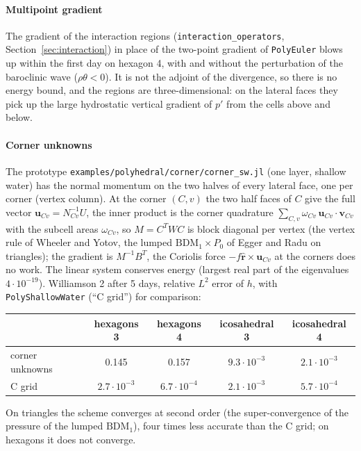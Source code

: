 \documentclass[11pt,a4paper]{article}
\newcommand{\code}[1]{\texttt{#1}}
\newcommand{\bu}{\mathbf{u}}
\newcommand{\bv}{\mathbf{v}}
\newcommand{\rhat}{\hat{\mathbf{r}}}
\begin{document}
\paragraph{Multipoint gradient} The gradient of the interaction regions (\code{interaction\_operators},
Section~\ref{sec:interaction}) in place of the two-point gradient of \code{PolyEuler} blows up within the first
day on hexagon 4, with and without the perturbation of the baroclinic wave ($\rho\theta < 0$). It is not
the adjoint of the divergence, so there is no energy bound, and the regions are three-dimensional: on the
lateral faces they pick up the large hydrostatic vertical gradient of $p'$ from the cells above and below.

\paragraph{Corner unknowns} The prototype \code{examples/polyhedral/corner/corner\_sw.jl} (one layer,
shallow water) has the normal momentum on the two halves of every lateral face, one per corner (vertex
column). At the corner $(C, v)$ the two half faces of $C$ give the full vector $\bu_{Cv} = N_{Cv}^{-1}U$,
the inner product is the corner quadrature $\sum_{C,v}\omega_{Cv}\,\bu_{Cv}\cdot\bv_{Cv}$ with the subcell
areas $\omega_{Cv}$, so $M = C^TWC$ is block diagonal per vertex (the vertex rule of Wheeler and Yotov,
the lumped $\mathrm{BDM}_1\times P_0$ of Egger and Radu on triangles); the gradient is $M^{-1}B^T$, the
Coriolis force $-f\rhat\times\bu_{Cv}$ at the corners does no work. The linear system conserves energy
(largest real part of the eigenvalues $4\cdot10^{-19}$). Williamson 2 after 5 days, relative $L^2$
error of $h$, with \code{PolyShallowWater} (``C grid'') for comparison:
\begin{center}\small
\begin{tabular}{lcccc}
\toprule
& hexagons 3 & hexagons 4 & icosahedral 3 & icosahedral 4 \\
\midrule
corner unknowns & 0.145 & 0.157 & $9.3\cdot10^{-3}$ & $2.1\cdot10^{-3}$ \\
C grid & $2.7\cdot10^{-3}$ & $6.7\cdot10^{-4}$ & $2.1\cdot10^{-3}$ & $5.7\cdot10^{-4}$ \\
\bottomrule
\end{tabular}
\end{center}
On triangles the scheme converges at second order (the super-convergence of the pressure of the lumped
$\mathrm{BDM}_1$), four times less accurate than the C grid; on hexagons it does not converge.
\end{document}
